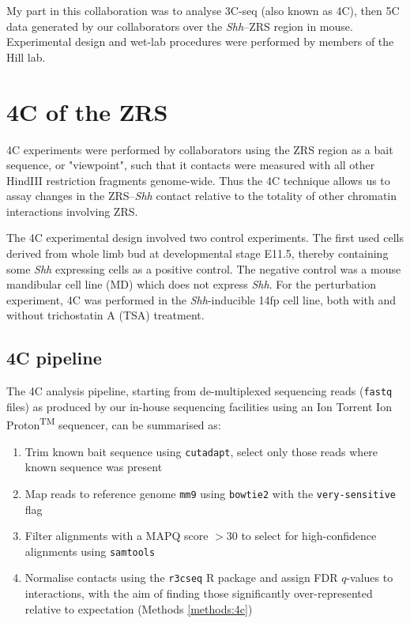 \documentclass[a4paper,11pt,oneside]{book}
\begin{document}
My part in this collaboration was to analyse 3C-seq (also known as 4C), then 5C data generated by our collaborators over the \emph{Shh}--ZRS region in mouse. Experimental design and wet-lab procedures were performed by members of the Hill lab.

\section{4C of the ZRS}\label{sec:4cshh}

4C experiments were performed by collaborators using the ZRS region as a bait sequence, or "viewpoint", such that it contacts were measured with all other HindIII restriction fragments genome-wide. Thus the 4C technique allows us to assay changes in the ZRS--\emph{Shh} contact relative to the totality of other chromatin interactions involving ZRS.

The 4C experimental design involved two control experiments. The first used cells derived from whole limb bud at developmental stage E11.5, thereby containing some \emph{Shh} expressing cells as a positive control. The negative control was a mouse mandibular cell line (MD) which does not express \emph{Shh}. For the perturbation experiment, 4C was performed in the \emph{Shh}-inducible 14fp cell line, both with and without trichostatin A (TSA) treatment.

\subsection{4C pipeline}

The 4C analysis pipeline, starting from de-multiplexed sequencing reads (\texttt{fastq} files) as produced by our in-house sequencing facilities using an Ion Torrent Ion Proton\textsuperscript{TM} sequencer, can be summarised as:

\begin{enumerate}
\item Trim known bait sequence using \texttt{cutadapt},\cite{cutadapt} select only those reads where known sequence was present
\item Map reads to reference genome \texttt{mm9} using \texttt{bowtie2}\cite{Langmead2012} with the \texttt{very-sensitive} flag
\item Filter alignments with a MAPQ score $>30$ to select for high-confidence alignments using \texttt{samtools}\cite{Li2009}
\item Normalise contacts using the \texttt{r3cseq} R package and assign FDR $q$-values to interactions, with the aim of finding those significantly over-represented relative to expectation (Methods \ref{methods:4c})
\end{enumerate}
\end{document}
